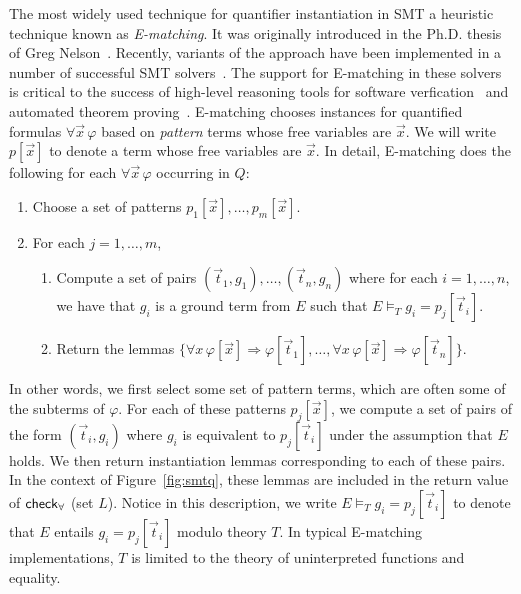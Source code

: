 \documentclass[oribibl]{llncs}
\begin{document}
The most widely used technique for quantifier instantiation in SMT a heuristic technique known as \emph{E-matching}.
It was originally introduced in the Ph.D. thesis of Greg Nelson~\cite{}.
Recently, variants of the approach have been implemented in a number of successful SMT solvers~\cite{}.
The support for E-matching in these solvers is critical to the success of high-level reasoning tools for 
software verfication~\cite{} and automated theorem proving~\cite{}.
E-matching chooses instances for quantified formulas $\forall \vec x\, \varphi$
based on \emph{pattern} terms whose free variables are $\vec x$.
We will write $p[ \vec x ]$ to denote a term whose free variables are $\vec x$.
In detail, 
E-matching does the following for each $\forall \vec x\, \varphi$ occurring in $Q$:
\begin{enumerate}
\item Choose a set of patterns $p_1[ \vec x ], \ldots, p_m[ \vec x ]$.
\item For each $j = 1, \ldots, m$,
\begin{enumerate}
\item Compute a set of pairs $(\vec t_{1},g_{1}), \ldots, (\vec t_{n}, g_{n})$ 
where for each $i = 1, \ldots, n$, we have that $g_i$ is a ground term from $E$ such that $E \models_T g_{i} = p_j[ \vec t_{i} ]$.
\item Return the lemmas $\{ \forall x\, \varphi[\vec x] \Rightarrow \varphi[\vec t_{1}], \ldots, \forall x\, \varphi[\vec x] \Rightarrow \varphi[\vec t_{n}] \}$.
\end{enumerate}
\end{enumerate}

In other words, we first select some set of pattern terms, which are often some of the subterms of $\varphi$.
For each of these patterns $p_j[ \vec x ]$, we compute a set of pairs of the form $( \vec t_i, g_i )$ where 
$g_i$ is equivalent to $p_j[ \vec t_i ]$ under the assumption that $E$ holds.
We then return instantiation lemmas corresponding to each of these pairs. 
In the context of Figure~\ref{fig:smtq}, these lemmas are included in the return value of $\small\mathsf{check}_\forall$ (set $L$).
Notice in this description, we write $E \models_T g_{i} = p_j[ \vec t_{i} ]$ to denote that $E$ entails
$g_{i} = p_j[ \vec t_{i} ]$ modulo theory $T$.  In typical E-matching implementations, $T$ is limited to the theory of uninterpreted functions and equality.
\end{document}
